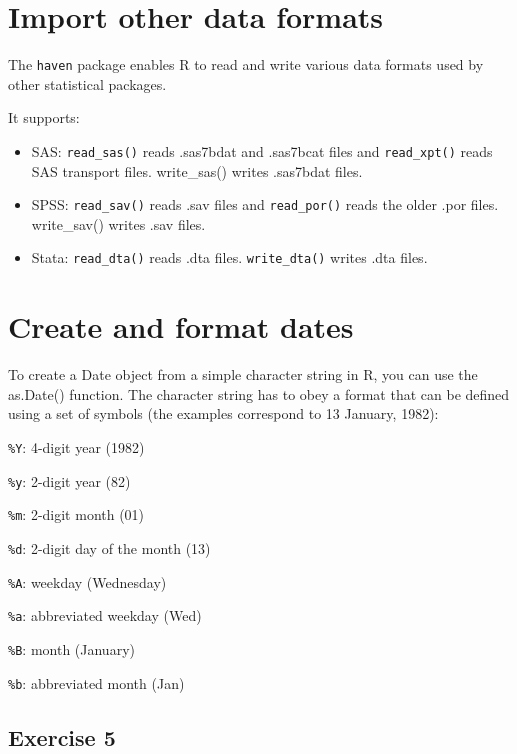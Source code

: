 \documentclass[
]{book}
\providecommand{\tightlist}{%
  \setlength{\itemsep}{0pt}\setlength{\parskip}{0pt}}
\begin{document}
\section*{Import other data formats}\label{import-other-data-formats}

The \texttt{haven} package enables R to read and write various data formats used by other statistical packages.

It supports:

\begin{itemize}
\tightlist
\item
  SAS: \texttt{read\_sas()} reads .sas7bdat and .sas7bcat files and \texttt{read\_xpt()} reads SAS transport files. write\_sas() writes .sas7bdat files.
\item
  SPSS: \texttt{read\_sav()} reads .sav files and \texttt{read\_por()} reads the older .por files. write\_sav() writes .sav files.
\item
  Stata: \texttt{read\_dta()} reads .dta files. \texttt{write\_dta()} writes .dta files.
\end{itemize}

\section*{Create and format dates}\label{create-and-format-dates}

To create a Date object from a simple character string in R, you can use the as.Date() function. The character string has to obey a format that can be defined using a set of symbols (the examples correspond to 13 January, 1982):

\texttt{\%Y}: 4-digit year (1982)

\texttt{\%y}: 2-digit year (82)

\texttt{\%m}: 2-digit month (01)

\texttt{\%d}: 2-digit day of the month (13)

\texttt{\%A}: weekday (Wednesday)

\texttt{\%a}: abbreviated weekday (Wed)

\texttt{\%B}: month (January)

\texttt{\%b}: abbreviated month (Jan)

\subsection*{Exercise 5}\label{exercise-5}
\end{document}
